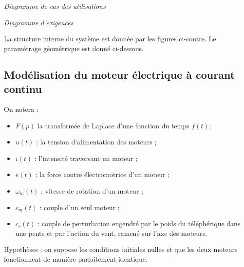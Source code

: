 \documentclass[10pt]{article}
\begin{document}
\begin{minipage}[c]{.33\linewidth}
\begin{center}

\textit{Diagramme de cas des utilisations}
\end{center}
\end{minipage} \hfill
\begin{minipage}[c]{.63\linewidth}
\begin{center}

\textit{Diagramme d'exigences}
\end{center}
\end{minipage}

\vspace{.25cm}

La structure interne du système est donnée par les figures ci-contre. Le paramétrage géométrique est donné ci-dessous.

\vspace{.25cm}




\subsection*{Modélisation du moteur électrique à courant continu}
On notera :
\begin{itemize}
\item $F(p)$ la transformée de Laplace d’une fonction du temps $f(t)$;
\item $u(t)$ : la tension d’alimentation des moteurs ;
\item $i(t)$ : l’intensité traversant un moteur ;
\item $e(t)$ : la force contre électromotrice d’un moteur ;
\item $\omega_m (t)$ : vitesse de rotation d’un moteur ;
\item $c_m (t)$ : couple d’un seul moteur ;
\item $c_r (t)$ : couple de perturbation engendré par le poids du téléphérique dans une pente et par l’action du vent, ramené sur l’axe des moteurs.	 
\end{itemize}


Hypothèses : on suppose les conditions initiales nulles et que les deux moteurs fonctionnent de manière parfaitement identique. 
\end{document}
